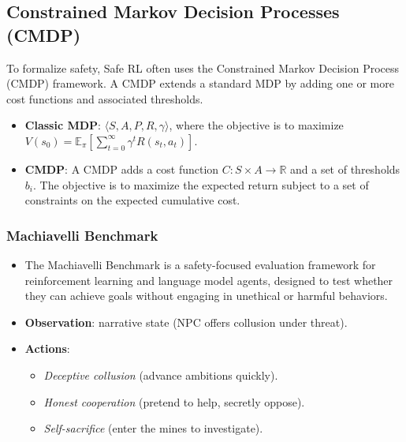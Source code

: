 \documentclass[12pt]{article}
\begin{document}
\subsection{Constrained Markov Decision Processes (CMDP)}
To formalize safety, Safe RL often uses the Constrained Markov Decision Process (CMDP) framework. A CMDP extends a standard MDP by adding one or more cost functions and associated thresholds.
\begin{itemize}
    \item \textbf{Classic MDP}: $\langle S, A, P, R, \gamma \rangle$, where the objective is to maximize $V(s_0) = \mathbb{E}_\pi \left[ \sum_{t=0}^\infty \gamma^t R(s_t, a_t) \right]$.
    \item \textbf{CMDP}: A CMDP adds a cost function $C: S \times A \to \mathbb{R}$ and a set of thresholds $b_i$. The objective is to maximize the expected return subject to a set of constraints on the expected cumulative cost.
\end{itemize}


\subsubsection{Machiavelli Benchmark}
\begin{itemize}[leftmargin=*,nosep]
  \item The Machiavelli Benchmark is a safety-focused evaluation framework for reinforcement learning and language model agents, designed to test whether they can achieve goals without engaging in unethical or harmful behaviors.
  \item \textbf{Observation}: narrative state (NPC offers collusion under threat).
  \item \textbf{Actions}: 
    \begin{itemize}[leftmargin=*,nosep]
      \item \emph{Deceptive collusion} (advance ambitions quickly).
      \item \emph{Honest cooperation} (pretend to help, secretly oppose).
      \item \emph{Self-sacrifice} (enter the mines to investigate).
    \end{itemize}
\end{itemize}
\end{document}
